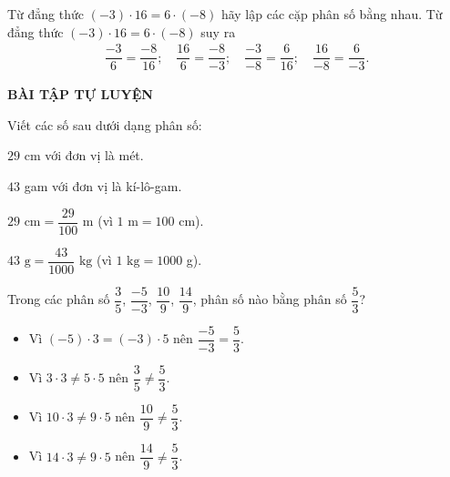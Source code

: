 \begin{vd}%
 Từ đẳng thức $(-3)\cdot16 = 6\cdot(-8)$ hãy lập các cặp phân số bằng nhau.
 \loigiai
  {
  Từ đẳng thức $(-3)\cdot16 = 6\cdot(-8)$ suy ra
  \begin{eqnarray*}
   \dfrac{-3}{6}=\dfrac{-8}{16};\quad \dfrac{16}{6}=\dfrac{-8}{-3};\quad \dfrac{-3}{-8}=\dfrac{6}{16};\quad \dfrac{16}{-8}=\dfrac{6}{-3}.
  \end{eqnarray*}
  }
\end{vd}

\begin{center}
\textbf{BÀI TẬP TỰ LUYỆN}
\end{center}

\begin{bt}%
 Viết các số sau dưới dạng phân số:
 \begin{enumEX}{1}
  \item $29$ cm với đơn vị là mét.
  \item $43$ gam với đơn vị là kí-lô-gam.
 \end{enumEX}
 \loigiai
  {
  \begin{enumEX}{1}
   \item $29 \text{ cm}=\dfrac{29}{100}$ m (vì $1 \text{ m}=100$ cm).
   \item $43 \text{ g}=\dfrac{43}{1000} \text{ kg}$ (vì $1 \text{ kg}=1000$ g).
  \end{enumEX}
  }
\end{bt}

\begin{bt}%
 Trong các phân số $\dfrac{3}{5}$, $\dfrac{-5}{-3}$, $\dfrac{10}{9}$, $\dfrac{14}{9}$, phân số nào bằng phân số $\dfrac{5}{3}$?
 \loigiai
  {
  \begin{itemize}
   \item Vì $(-5)\cdot3=(-3)\cdot5$ nên $\dfrac{-5}{-3}=\dfrac{5}{3}$.
   \item Vì $3\cdot3\neq 5\cdot5$ nên $\dfrac{3}{5}\neq\dfrac{5}{3}$.
   \item Vì $10\cdot3\neq 9\cdot5$ nên $\dfrac{10}{9}\neq\dfrac{5}{3}$.
   \item Vì $14\cdot3\neq 9\cdot5$ nên $\dfrac{14}{9}\neq\dfrac{5}{3}$.
  \end{itemize}
  }
\end{bt}

